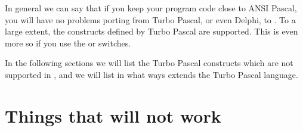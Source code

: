 \documentclass{report}
\begin{document}
In general we can say that if you keep your program code close to ANSI
Pascal, you will have no problems porting from Turbo Pascal, or even Delphi, to
\fpc. To a large extent, the constructs defined by Turbo Pascal are
supported. This is even more so if you use the  or 
switches.

In the following sections we will list the Turbo Pascal constructs which are
not supported in \fpc, and we will list in what ways \fpc extends the Turbo
Pascal language.


\section{Things that will not work}
\end{document}
